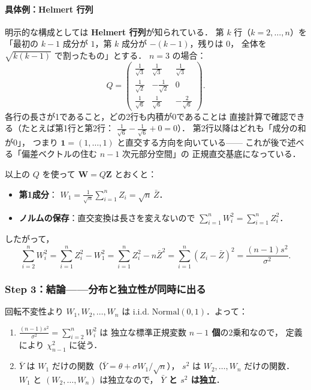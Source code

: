 \documentclass[lualatex,ja=standard,a4paper,12pt]{bxjsarticle}
\begin{document}
\paragraph{具体例：Helmert 行列}
明示的な構成としては \textbf{Helmert 行列}が知られている．
第 $k$ 行（$k = 2, \ldots, n$）を
「最初の $k-1$ 成分が $1$，第 $k$ 成分が $-(k-1)$，残りは $0$，
全体を $\sqrt{k(k-1)}$ で割ったもの」とする．
$n = 3$ の場合：
\[
  Q =
  \begin{pmatrix}
    \frac{1}{\sqrt{3}} & \frac{1}{\sqrt{3}} & \frac{1}{\sqrt{3}} \\[4pt]
    \frac{1}{\sqrt{2}} & -\frac{1}{\sqrt{2}} & 0 \\[4pt]
    \frac{1}{\sqrt{6}} & \frac{1}{\sqrt{6}} & -\frac{2}{\sqrt{6}}
  \end{pmatrix}.
\]
各行の長さが1であること，どの2行も内積が0であることは
直接計算で確認できる（たとえば第1行と第2行：
$\frac{1}{\sqrt{6}} - \frac{1}{\sqrt{6}} + 0 = 0$）．
第2行以降はどれも「成分の和が0」，
つまり $\boldsymbol{1} = (1, \ldots, 1)$ と直交する方向を向いている——
これが後で述べる「偏差ベクトルの住む $n-1$ 次元部分空間」の
正規直交基底になっている．

\medskip
以上の $Q$ を使って $\boldsymbol{W} = Q\boldsymbol{Z}$ とおくと：

\begin{itemize}
  \item \textbf{第1成分}：
        $\displaystyle W_1 = \frac{1}{\sqrt{n}}\sum_{i=1}^n Z_i = \sqrt{n}\,\bar{Z}$．
  \item \textbf{ノルムの保存}：直交変換は長さを変えないので
        $\displaystyle \sum_{i=1}^n W_i^2 = \sum_{i=1}^n Z_i^2$．
\end{itemize}

したがって，
\[
  \sum_{i=2}^n W_i^2
  = \sum_{i=1}^n Z_i^2 - W_1^2
  = \sum_{i=1}^n Z_i^2 - n\bar{Z}^2
  = \sum_{i=1}^n (Z_i - \bar{Z})^2
  = \frac{(n-1)s^2}{\sigma^2}.
\]

\subsubsection*{Step 3：結論——分布と独立性が同時に出る}

回転不変性より $W_1, W_2, \ldots, W_n$ は i.i.d. $\mathrm{Normal}(0,1)$．よって：

\begin{enumerate}
  \item $\displaystyle \frac{(n-1)s^2}{\sigma^2} = \sum_{i=2}^n W_i^2$ は
        独立な標準正規変数 \textbf{$n-1$ 個}の2乗和なので，
        定義により $\chi^2_{n-1}$ に従う．
  \item $\bar{Y}$ は $W_1$ だけの関数（$\bar{Y} = \theta + \sigma W_1/\sqrt{n}$），
        $s^2$ は $W_2, \ldots, W_n$ だけの関数．
        $W_1$ と $(W_2, \ldots, W_n)$ は独立なので，
        \textbf{$\bar{Y}$ と $s^2$ は独立}．
\end{enumerate}
\end{document}
